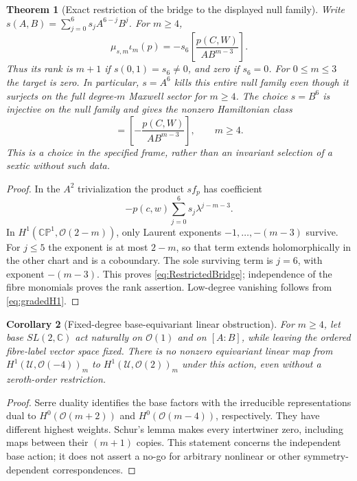 \documentclass[aps,prd,reprint,nofootinbib,superscriptaddress]{revtex4-2}
\newtheorem{theorem}{Theorem}[section]
\newtheorem{corollary}[theorem]{Corollary}
\theoremstyle{definition}
\theoremstyle{remark}
\newcommand{\C}{\mathbb{C}}
\newcommand{\CP}{\mathbb{CP}}
\newcommand{\cO}{\mathcal{O}}
\newcommand{\cU}{\mathcal{U}}
\begin{document}
\begin{theorem}[Exact restriction of the bridge to the displayed null family]
\label{thm:RestrictedBridge}
Write $s(A,B)=\sum_{j=0}^{6}s_jA^{6-j}B^j$. For $m\ge4$,
\begin{equation}
\mu_{s,m}\iota_m(p)
=-s_6\left[\frac{p(C,W)}{A B^{m-3}}\right].
\label{eq:RestrictedBridge}
\end{equation}
Thus its rank is $m+1$ if $s(0,1)=s_6\ne0$, and zero if $s_6=0$. For $0\le m\le3$ the target is zero. In particular, $s=A^6$ kills this entire null family even though it surjects on the full degree-$m$ Maxwell sector for $m\ge4$. The choice $s=B^6$ is injective on the null family and gives the nonzero Hamiltonian class
\begin{equation}
[h_p]=\left[-\frac{p(C,W)}{A B^{m-3}}\right],\qquad m\ge4.
\label{eq:PreferredFrameHamiltonian}
\end{equation}
This is a choice in the specified frame, rather than an invariant selection of a sextic without such data.
\end{theorem}
\begin{proof}
In the $A^2$ trivialization the product $sf_p$ has coefficient
\begin{equation}
-p(c,w)\sum_{j=0}^{6}s_j\lambda^{j-m-3}.
\label{eq:RestrictionLaurent}
\end{equation}
In $H^1(\CP^1,\cO(2-m))$, only Laurent exponents $-1,\ldots,-(m-3)$ survive. For $j\le5$ the exponent is at most $2-m$, so that term extends holomorphically in the other chart and is a coboundary. The sole surviving term is $j=6$, with exponent $-(m-3)$. This proves \eqref{eq:RestrictedBridge}; independence of the fibre monomials proves the rank assertion. Low-degree vanishing follows from \eqref{eq:gradedH1}.
\end{proof}

\begin{corollary}[Fixed-degree base-equivariant linear obstruction]
\label{cor:SchurObstruction}
For $m\ge4$, let base $SL(2,\C)$ act naturally on $\cO(1)$ and on $[A:B]$, while leaving the ordered fibre-label vector space fixed. There is no nonzero equivariant linear map from $H^1(\cU,\cO(-4))_m$ to $H^1(\cU,\cO(2))_m$ under this action, even without a zeroth-order restriction.
\end{corollary}
\begin{proof}
Serre duality identifies the base factors with the irreducible representations dual to $H^0(\cO(m+2))$ and $H^0(\cO(m-4))$, respectively. They have different highest weights. Schur's lemma makes every intertwiner zero, including maps between their $(m+1)$ copies. This statement concerns the independent base action; it does not assert a no-go for arbitrary nonlinear or other symmetry-dependent correspondences.
\end{proof}
\end{document}
